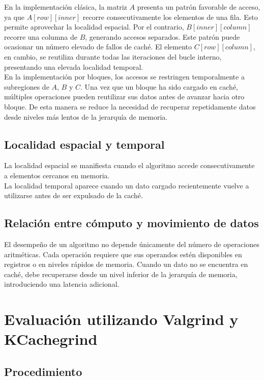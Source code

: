 \documentclass[a4paper,12pt]{article}
\begin{document}
En la implementación clásica, la matriz $A$ presenta un patrón favorable de acceso, ya que $A[row][inner]$ recorre consecutivamente los elementos de una fila. Esto permite aprovechar la localidad espacial. Por el contrario, $B[inner][column]$ recorre una columna de $B$, generando accesos separados. Este patrón puede ocasionar un número elevado de fallos de caché. El elemento $C[row][column]$, en cambio, se reutiliza durante todas las iteraciones del bucle interno, presentando una elevada localidad temporal. \\

En la implementación por bloques, los accesos se restringen temporalmente a subregiones de $A$, $B$ y $C$. Una vez que un bloque ha sido cargado en caché, múltiples operaciones pueden reutilizar sus datos antes de avanzar hacia otro bloque. De esta manera se reduce la necesidad de recuperar repetidamente datos desde niveles más lentos de la jerarquía de memoria.

\subsection{Localidad espacial y temporal}

La localidad espacial se manifiesta cuando el algoritmo accede consecutivamente a elementos cercanos en memoria. \\

La localidad temporal aparece cuando un dato cargado recientemente vuelve a utilizarse antes de ser expulsado de la caché.

\subsection{Relación entre cómputo y movimiento de datos}

El desempeño de un algoritmo no depende únicamente del número de operaciones aritméticas. Cada operación requiere que sus operandos estén disponibles en registros o en niveles rápidos de memoria. Cuando un dato no se encuentra en caché, debe recuperarse desde un nivel inferior de la jerarquía de memoria, introduciendo una latencia adicional.

\section{Evaluación utilizando Valgrind y KCachegrind}

\subsection{Procedimiento}
\end{document}
